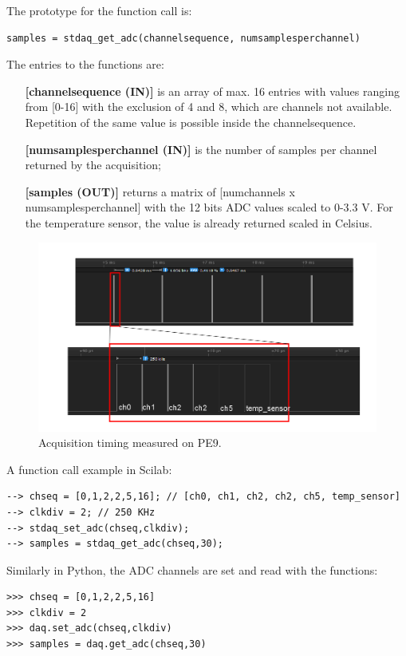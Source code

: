 \documentclass[letterpaper,10pt,english]{hitec}
\begin{document}
The prototype for the function call is:
\begin{verbatim}
samples = stdaq_get_adc(channelsequence, numsamplesperchannel)
\end{verbatim}
The entries to the functions are:
\begin{itemize}
\item [\textbf{[channelsequence (IN)]}] is an array of max. 16 entries with values ranging from [0-16] with the exclusion of 4 and 8, which are channels not available. Repetition of the same value is possible inside the channelsequence.
\item [\textbf{[numsamplesperchannel (IN)]}] is the number of samples per channel returned by the acquisition;
\item [\textbf{[samples (OUT)]}] returns a matrix of [numchannels x numsamplesperchannel] with the 12 bits ADC values scaled to 0-3.3 V. For the temperature sensor, the value is already returned scaled in Celsius.
\end{itemize}
\begin{figure}[ht!]
\includegraphics[scale=0.4]{../img/adc_timing_a.png}
\caption{Acquisition timing measured on PE9.}
\label{fig:adc_timing_a}
\end{figure}
A function call example in Scilab:
\begin{verbatim}
--> chseq = [0,1,2,2,5,16]; // [ch0, ch1, ch2, ch2, ch5, temp_sensor]
--> clkdiv = 2; // 250 KHz
--> stdaq_set_adc(chseq,clkdiv);
--> samples = stdaq_get_adc(chseq,30);
\end{verbatim}
%
Similarly in Python, the ADC channels are set and read with the functions:
\begin{verbatim}
>>> chseq = [0,1,2,2,5,16]
>>> clkdiv = 2
>>> daq.set_adc(chseq,clkdiv)
>>> samples = daq.get_adc(chseq,30)
\end{verbatim}
\end{document}
